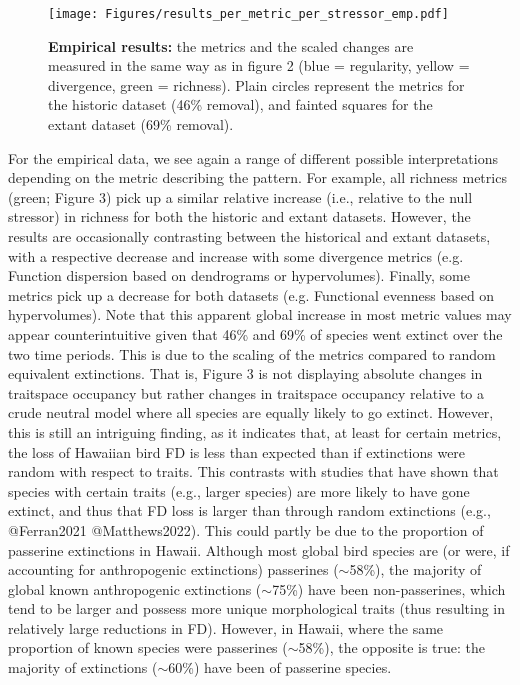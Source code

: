 \documentclass[12pt,letterpaper]{article}
\begin{document}
\begin{figure}[!htbp]
\centering
   \texttt{[image: Figures/results\_per\_metric\_per\_stressor\_emp.pdf]}
\caption{\scriptsize{\textbf{Empirical results:} the metrics and the scaled changes are measured in the same way as in figure 2 (blue = regularity, yellow = divergence, green = richness).
Plain circles represent the metrics for the historic dataset (46\% removal), and fainted squares for the extant dataset (69\% removal).
}}
\label{Fig:simulation_results}
\end{figure}
\bigskip

For the empirical data, we see again a range of different possible interpretations depending on the metric describing the pattern.
For example, all richness metrics (green; Figure 3) pick up a similar relative increase (i.e., relative to the null stressor) in richness for both the historic and extant datasets.
However, the results are occasionally contrasting between the historical and extant datasets, with a respective decrease and increase with some divergence metrics (e.g.
Function dispersion based on dendrograms or hypervolumes).
Finally, some metrics pick up a decrease for both datasets (e.g.
Functional evenness based on hypervolumes).
Note that this apparent global increase in most metric values may appear counterintuitive given that 46\% and 69\% of species went extinct over the two time periods.
This is due to the scaling of the metrics compared to random equivalent extinctions.
That is, Figure 3 is not displaying absolute changes in traitspace occupancy but rather changes in traitspace occupancy relative to a crude neutral model where all species are equally likely to go extinct.
However, this is still an intriguing finding, as it indicates that, at least for certain metrics, the loss of Hawaiian bird FD is less than expected than if extinctions were random with respect to traits.
This contrasts with studies that have shown that species with certain traits (e.g., larger species) are more likely to have gone extinct, and thus that FD loss is larger than through random extinctions (e.g., @Ferran2021 @Matthews2022).
This could partly be due to the proportion of passerine extinctions in Hawaii.
Although most global bird species are (or were, if accounting for anthropogenic extinctions) passerines ($\sim$58\%), the majority of global known anthropogenic extinctions ($\sim$75\%) have been non-passerines, which tend to be larger and possess more unique morphological traits (thus resulting in relatively large reductions in FD).
However, in Hawaii, where the same proportion of known species were passerines ($\sim$58\%), the opposite is true: the majority of extinctions ($\sim$60\%) have been of passerine species.
\end{document}
